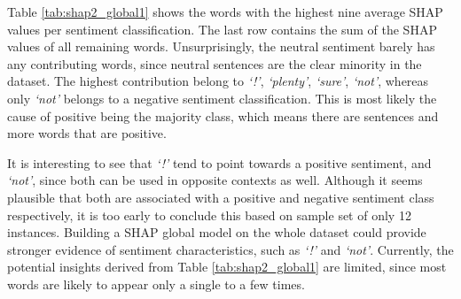 Table \ref{tab:shap2_global1} shows the words with the highest nine average SHAP values per sentiment classification. The last row contains the sum of the SHAP values of all remaining words. Unsurprisingly, the neutral sentiment barely has any contributing words, since neutral sentences are the clear minority in the dataset. The highest contribution belong to \textit{`!'}, \textit{`plenty'}, \textit{`sure'}, \textit{`not'}, whereas only \textit{`not'} belongs to a negative sentiment classification. This is most likely the cause of positive being the majority class, which means there are sentences and more words that are positive.

It is interesting to see that \textit{`!'} tend to point towards a positive sentiment, and \textit{`not'}, since both can be used in opposite contexts as well. Although it seems plausible that both are associated with a positive and negative sentiment class respectively, it is too early to conclude this based on sample set of only 12 instances. Building a SHAP global model on the whole dataset could provide stronger evidence of sentiment characteristics, such as \textit{`!'} and \textit{`not'}. Currently, the potential insights derived from Table \ref{tab:shap2_global1} are limited, since most words are likely to appear only a single to a few times. 